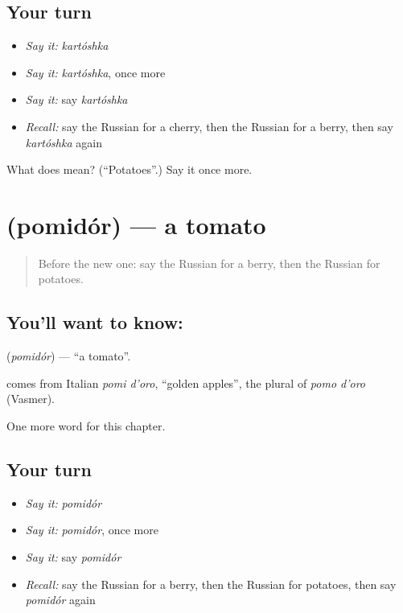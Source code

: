 \subsection*{Your turn}
\begin{itemize}
\raggedright
  \item \emph{Say it:} \emph{kartóshka}
  \item \emph{Say it:} \emph{kartóshka}, once more
  \item \emph{Say it:} say \emph{kartóshka}
  \item \emph{Recall:} say the Russian for a cherry, then the Russian for a berry, then say \emph{kartóshka} again
\end{itemize}

\begin{tcolorbox}[breakable,colback=teal!4,colframe=teal!35!black,title={Before you move on}]
What does  mean? (\textquotedblleft{}Potatoes\textquotedblright{}.) Say it once more.
\end{tcolorbox}
\section[\texorpdfstring{\ru{помидор} (pomidór)}{помидор (pomidór)}]{ (pomidór) — a tomato}

\label{lesson:RU-C45-tomato}



\begin{quote}
Before the new one: say the Russian for a berry, then the Russian for potatoes.
\end{quote}

\subsection*{You'll want to know: }
\textbf{} (\emph{pomidór}) — \textquotedblleft{}a tomato\textquotedblright{}.

\begin{cousinweb}
\textbf{} comes from Italian \emph{pomi d'oro}, \textquotedblleft{}golden apples\textquotedblright{}, the plural of \emph{pomo d'oro} (Vasmer).
\end{cousinweb}

\begin{grammarlens}[title={What you've built}]
One more word for this chapter.
\end{grammarlens}

\subsection*{Your turn}
\begin{itemize}
\raggedright
  \item \emph{Say it:} \emph{pomidór}
  \item \emph{Say it:} \emph{pomidór}, once more
  \item \emph{Say it:} say \emph{pomidór}
  \item \emph{Recall:} say the Russian for a berry, then the Russian for potatoes, then say \emph{pomidór} again
\end{itemize}

